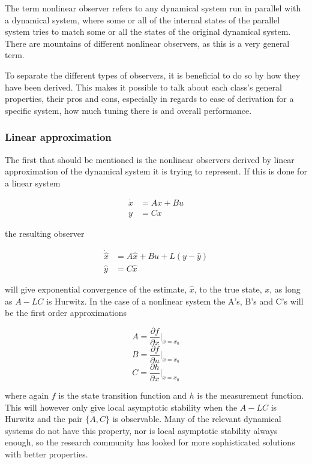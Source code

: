 The term nonlinear observer refers to any dynamical system run in parallel with a dynamical system, where some or all of the internal states of the parallel system tries to match some or all the states of the original dynamical system. There are mountains of different nonlinear observers, as this is a very general term. 

To separate the different types of observers, it is beneficial to do so by how they have been derived. This makes it possible to talk about each class's general properties, their pros and cons, especially in regards to ease of derivation for a specific system, how much tuning there is and overall performance.

\subsubsection{Linear approximation}

The first that should be mentioned is the nonlinear observers derived by linear approximation of the dynamical system it is trying to represent\cite{LinearizingNonlinObs}. If this is done for a linear system 

\begin{align}
    \Dot{x} &= Ax + Bu \\
    y &= Cx
\end{align}

the resulting observer

\begin{align}
    \Dot{\hat{x}} &= A\hat{x} + Bu + L(y - \hat{y}) \\
    \hat{y} &= C\hat{x}
\end{align}

will give exponential convergence of the estimate, $\hat{x}$, to the true state, $x$, as long as $A-LC$ is Hurwitz\cite{Hurwitz}. In the case of a nonlinear system the A's, B's and C's will be the first order approximations

\begin{equation}
    A = \frac{\partial f}{\partial x}|_{x=x_0}
\end{equation}
\begin{equation}
    B = \frac{\partial f}{\partial u}|_{x=x_0}
\end{equation}
\begin{equation}
    C = \frac{\partial h}{\partial x}|_{x=x_0}
\end{equation}

where again $f$ is the state transition function and $h$ is the measurement function. This will however only give local asymptotic stability when the $A-LC$ is Hurwitz and the pair $\{A,C\}$ is observable. Many of the relevant dynamical systems do not have this property, nor is local asymptotic stability always enough, so the research community has looked for more sophisticated solutions with better properties. 

